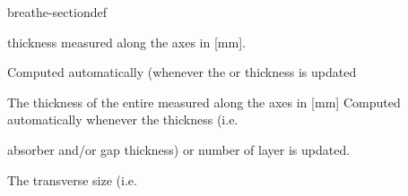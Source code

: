 \documentclass[letterpaper,10pt,english]{sphinxmanual}
\begin{document}
\begin{fulllineitems}
\begin{sphinxuseclass}{breathe-sectiondef}
\begin{fulllineitems}
\end{fulllineitems}


\begin{fulllineitems}
\label{\detokenize{Simulation/SimulationCodeDoc:_CPPv4N8Geometry11fLayerThickE}}
\pysigstartsignatures
\pysigstartmultiline
{}
\pysigstopmultiline
\pysigstopsignatures
\sphinxAtStartPar
{} thickness measured along the  axes in {[}mm{]}. 

\sphinxAtStartPar
Computed automatically (whenever the  or  thickness is updated 

\end{fulllineitems}


\begin{fulllineitems}
\label{\detokenize{Simulation/SimulationCodeDoc:_CPPv4N8Geometry10fCaloThickE}}
\pysigstartsignatures
\pysigstartmultiline
{}
\pysigstopmultiline
\pysigstopsignatures
\sphinxAtStartPar
The thickness of the entire  measured along the  axes in {[}mm{]} Computed automatically whenever the  thickness (i.e. 

\sphinxAtStartPar
absorber and/or gap thickness) or number of layer is updated. 

\end{fulllineitems}


\begin{fulllineitems}
\label{\detokenize{Simulation/SimulationCodeDoc:_CPPv4N8Geometry11fCaloSizeYZE}}
\pysigstartsignatures
\pysigstartmultiline
{}
\pysigstopmultiline
\pysigstopsignatures
\sphinxAtStartPar
The transverse size (i.e. 


\end{fulllineitems}
\end{sphinxuseclass}
\end{fulllineitems}
\end{document}
